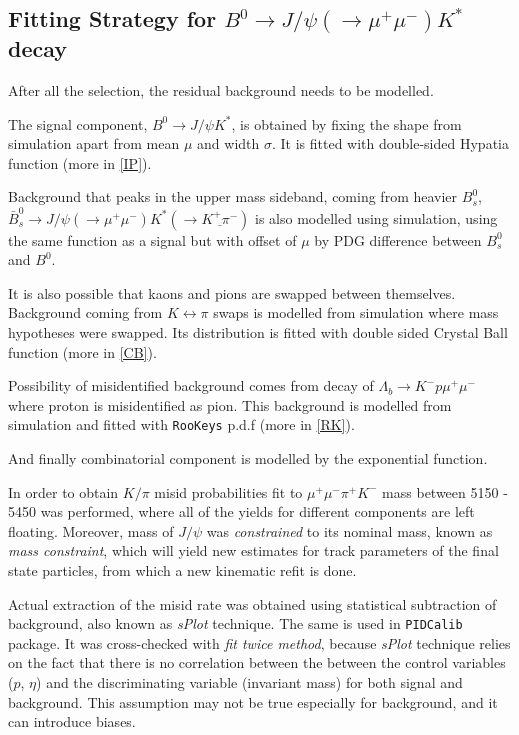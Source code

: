 \subsection{Fitting Strategy for $B^{0} \rightarrow J/\psi(\rightarrow \mu^{+} \mu^{-}) K^{*}$ decay }
After all the selection, the residual background needs to be modelled. 

The signal component, $B^{0} \rightarrow J/\psi K^{*}$, is obtained by fixing the shape from simulation apart from mean $\mu$ and width $\sigma$. It is fitted with double-sided Hypatia function \cite{Santos:2013gra} (more in \autoref{IP}).

Background that peaks in the upper mass sideband, coming from heavier $B^{0}_{s}$, $\bar{B}^{0}_{s} \rightarrow J/\psi (\rightarrow \mu^{+} \mu^{-}) K^*(\rightarrow \underline{K^{+} \pi^{-}})$ is also modelled using simulation, using the same function as a signal but with offset of $\mu$ by PDG difference between $B^{0}_{s}$ and $B^{0}$.

It is also possible that kaons and pions are swapped between themselves. Background coming from $K \leftrightarrow \pi$ swaps is modelled from simulation where mass hypotheses were swapped. Its distribution is fitted with double sided Crystal Ball function \cite{Skwarnicki:1986xj} (more in \autoref{CB}).

Possibility of misidentified background comes from decay of $\Lambda_{b} \rightarrow K^{-} p \mu^{+} \mu^{-}$ where proton is misidentified as pion. This background is modelled from simulation and fitted with \texttt{RooKeys} p.d.f (more in \autoref{RK}).

And finally combinatorial component is modelled by the exponential function.

In order to obtain $K/\pi$ misid probabilities fit to $\mu^{+} \mu^{-} \pi^{+} K^{-}$ mass between 5150 - 5450 \mevcc was performed, where all of the yields for different components are left floating. Moreover, mass of $J/\psi$ was \textit{constrained} to its nominal mass, known as \textit{mass constraint}, which will yield new estimates for track parameters of the final state particles, from which a new kinematic refit is done.

Actual extraction of the misid rate was obtained using statistical subtraction of background, also known as \textit{sPlot} technique. The same is used in \texttt{PIDCalib} package. It was cross-checked with \textit{fit twice method}, because \textit{sPlot} technique relies on the fact that there is no correlation between the between the control variables ($p$, $\eta$) and the discriminating variable (invariant mass) for both signal and background. This assumption may not be true especially for background, and it can introduce biases.

